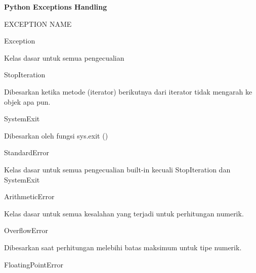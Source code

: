 \sloppy
\begin{center}{\fontsize{24pt}{24pt}\selectfont \textbf{Python Exceptions Handling}  \\}\end{center} 
\vspace{12pt}
\vspace{12pt}
 
EXCEPTION NAME \hspace*{0.5in}  \hspace*{0.5in}  \hspace*{0.5in}  \hspace*{0.5in}  

Exception \hspace*{0.5in}  \hspace*{0.5in}  

Kelas dasar untuk semua pengecualian 
\vspace{12pt}
 
StopIteration \hspace*{0.5in}  

Dibesarkan ketika metode (iterator) berikutnya dari iterator tidak mengarah ke objek apa pun. 
\vspace{12pt}

SystemExit \hspace*{0.5in}  \hspace*{0.5in}  

Dibesarkan oleh fungsi sys.exit () 
\vspace{12pt}

StandardError \hspace*{0.5in}  
 
Kelas dasar untuk semua pengecualian built-in kecuali StopIteration dan SystemExit 
\vspace{12pt}

ArithmeticError \hspace*{0.5in}  \hspace*{0.5in}  
 
Kelas dasar untuk semua kesalahan yang terjadi untuk perhitungan numerik. 
\vspace{12pt}

OverflowError \hspace*{0.5in}  \hspace*{0.5in}  

Dibesarkan saat perhitungan melebihi batas maksimum untuk tipe numerik.
\vspace{12pt}

FloatingPointError \hspace*{0.5in}  

